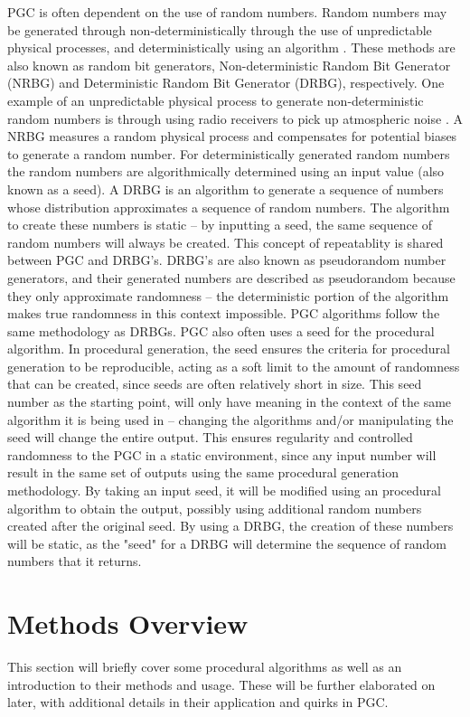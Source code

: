 \documentclass[10pt]{report}
\begin{document}
		PGC is often dependent on the use of random numbers. Random numbers may be generated through non-deterministically through the use of unpredictable physical processes, and deterministically using an algorithm \cite{rng}. These methods are also known as random bit generators, Non-deterministic Random Bit Generator (NRBG) and Deterministic Random Bit Generator (DRBG), respectively. One example of an unpredictable physical process to generate non-deterministic random numbers is through using radio receivers to pick up atmospheric noise \cite{random-org}. A NRBG measures a random physical process and compensates for potential biases to generate a random number. For deterministically generated random numbers the random numbers are algorithmically determined using an input value (also known as a seed). A DRBG is an algorithm to generate a sequence of numbers whose distribution approximates a sequence of random numbers. The algorithm to create these numbers is static -- by inputting a seed, the same sequence of random numbers will always be created. This concept of repeatablity is shared between PGC and DRBG's. DRBG's are also known as pseudorandom number generators, and their generated numbers are described as pseudorandom because they only approximate randomness -- the deterministic portion of the algorithm makes true randomness in this context impossible. PGC algorithms follow the same methodology as DRBGs. PGC also often uses a seed for the procedural algorithm. In procedural generation, the seed ensures the criteria for procedural generation to be reproducible, acting as a soft limit to the amount of randomness that can be created, since seeds are often relatively short in size. This seed number as the starting point, will only have meaning in the context of the same algorithm it is being used in -- changing the algorithms and/or manipulating the seed will change the entire output. This ensures regularity and controlled randomness to the PGC in a static environment, since any input number will result in the same set of outputs using the same procedural generation methodology. By taking an input seed, it will be modified using an procedural algorithm to obtain the output, possibly using additional random numbers created after the original seed. By using a DRBG, the creation of these numbers will be static, as the "seed" for a DRBG will determine the sequence of random numbers that it returns.
	
		\section{Methods Overview}
		This section will briefly cover some procedural algorithms as well as an introduction to their methods and usage. These will be further elaborated on later, with additional details in their application and quirks in PGC. 
		
\end{document}
